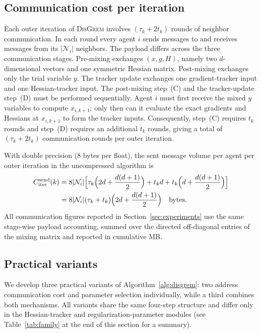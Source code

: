 \documentclass[review,onefignum,onetabnum]{siamart171218}
\begin{document}
	\subsection{Communication cost per iteration}\label{ssec:comm}
	
	Each outer iteration of \textsc{DisGrem} involves $(\tau_k + 2t_k)$ rounds of neighbor communication.
	In each round every agent $i$ sends messages to and receives messages from its $|\mathcal N_i|$ neighbors.
	The payload differs across the three communication stages.
	Pre-mixing exchanges $(x,g,H)$, namely two $d$-dimensional
	vectors and one symmetric Hessian matrix.
	Post-mixing exchanges only the trial variable $y$.
	The tracker update exchanges one gradient-tracker input and one
	Hessian-tracker input.
	The post-mixing step~(C) and the tracker-update step~(D) must be performed sequentially.
	Agent $i$ must first receive the mixed $y$ variables to compute $x_{i,k+1}$; only then can it evaluate the exact gradients and Hessians at $x_{i,k+1}$ to form the tracker inputs.
	Consequently, step~(C) requires $t_k$ rounds and step~(D) requires an additional $t_k$ rounds, giving a total of $(\tau_k+2t_k)$ communication rounds per outer iteration.
	
	With double precision (8 bytes per float), the sent message volume
	per agent per outer iteration in the uncompressed algorithm is
	\begin{equation}\label{eq:comm_cost_iter}
	\begin{aligned}
		C_{\mathrm{iter}}^{\mathrm{send}}(k)
		&=8|\mathcal N_i|\Bigl[
		\tau_k\Bigl(2d+\frac{d(d+1)}{2}\Bigr)
		+t_kd
		+t_k\Bigl(d+\frac{d(d+1)}{2}\Bigr)
		\Bigr] \\
		&=8|\mathcal N_i|(\tau_k+t_k)
		\Bigl(2d+\frac{d(d+1)}{2}\Bigr)
		\quad \text{bytes}.
	\end{aligned}
	\end{equation}
	All communication figures reported in Section~\ref{sec:experiments}
	use the same stage-wise payload accounting, summed over the directed
	off-diagonal entries of the mixing matrix and reported in cumulative MB.
	
	\subsection{Practical variants}\label{ssec:variants}
	
	We develop three practical variants of Algorithm~\ref{alg:disgrem}:
	two address communication cost and parameter selection individually,
	while a third combines both mechanisms.
	All variants share the same four-step structure and differ only in the
	Hessian-tracker and regularization-parameter modules
	(see Table~\ref{tab:family} at the end of this section for a summary).
	
\end{document}
